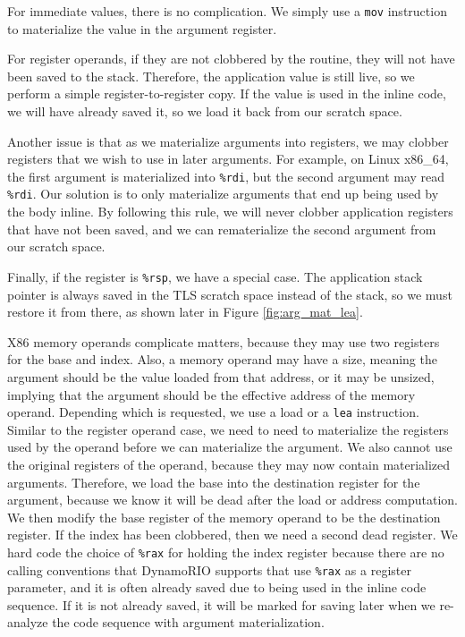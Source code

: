 For immediate values, there is no complication.  We simply use a {\tt mov}
instruction to materialize the value in the argument register.

For register operands, if they are not clobbered by the routine, they will not
have been saved to the stack.  Therefore, the application value is still live,
so we perform a simple register-to-register copy.  If the value is used in the
inline code, we will have already saved it, so we load it back from our scratch
space.

Another issue is that as we materialize arguments into registers, we may clobber
registers that we wish to use in later arguments.  For example, on Linux
x86\_64, the first argument is materialized into {\tt \%rdi}, but the second
argument may read {\tt \%rdi}.  Our solution is to only materialize arguments
that end up being used by the body inline.  By following this rule, we will
never clobber application registers that have not been saved, and we can
rematerialize the second argument from our scratch space.

Finally, if the register is {\tt \%rsp}, we have a special case.  The
application stack pointer is always saved in the TLS scratch space instead of
the stack, so we must restore it from there, as shown later in Figure
\ref{fig:arg_mat_lea}.

X86 memory operands complicate matters, because they may use two registers for
the base and index.  Also, a memory operand may have a size, meaning the
argument should be the value loaded from that address, or it may be unsized,
implying that the argument should be the effective address of the memory
operand.  Depending which is requested, we use a load or a {\tt lea}
instruction.  Similar to the register operand case, we need to need to
materialize the registers used by the operand before we can materialize the
argument.  We also cannot use the original registers of the operand, because
they may now contain materialized arguments.  Therefore, we load the base into
the destination register for the argument, because we know it will be dead after
the load or address computation.  We then modify the base register of the memory
operand to be the destination register.  If the index has been clobbered, then
we need a second dead register.  We hard code the choice of {\tt \%rax} for
holding the index register because there are no calling conventions that
DynamoRIO supports that use {\tt \%rax} as a register parameter, and it is often
already saved due to being used in the inline code sequence.  If it is not
already saved, it will be marked for saving later when we re-analyze the code
sequence with argument materialization.

